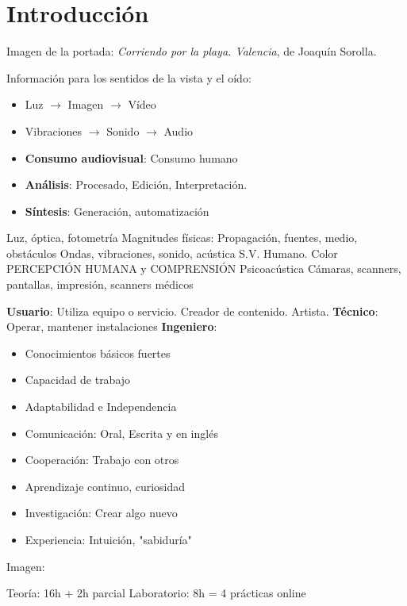 \documentclass[a4paper]{book}
\begin{document}
\newpage
{}
{}
\section*{Introducción}
Imagen de la portada: \textsl{Corriendo por la playa. Valencia}, de Joaquín Sorolla.

Información para los sentidos de la vista y el oído:
\begin{itemize}
	 \item Luz $\longrightarrow$ Imagen $\longrightarrow$ Vídeo
	 \item Vibraciones $\longrightarrow$ Sonido $\longrightarrow$ Audio
\end{itemize}

\begin{itemize}
	 \item \textbf{Consumo audiovisual}: Consumo humano
	 \item \textbf{Análisis}: Procesado, Edición, Interpretación.
	 \item \textbf{Síntesis}: Generación, automatización
\end{itemize}

Luz, óptica, fotometría  Magnitudes físicas: Propagación, fuentes, medio, obstáculos
Ondas, vibraciones, sonido, acústica 
S.V. Humano. Color PERCEPCIÓN HUMANA y COMPRENSIÓN Psicoacústica
Cámaras, scanners, pantallas, impresión, scanners médicos

\textbf{Usuario}: Utiliza equipo o servicio. Creador de contenido. Artista.
\textbf{Técnico}: Operar, mantener instalaciones
\textbf{Ingeniero}:
\begin{itemize}
	 \item Conocimientos básicos fuertes
	 \item Capacidad de trabajo
	 \item Adaptabilidad e Independencia
	 \item Comunicación: Oral, Escrita y en inglés
	 \item Cooperación: Trabajo con otros
	 \item Aprendizaje continuo, curiosidad
	 \item Investigación: Crear algo nuevo
	 \item Experiencia: Intuición, "sabiduría"
\end{itemize}

Imagen: 

Teoría: 16h + 2h parcial
Laboratorio: 8h = 4 prácticas online
\end{document}
